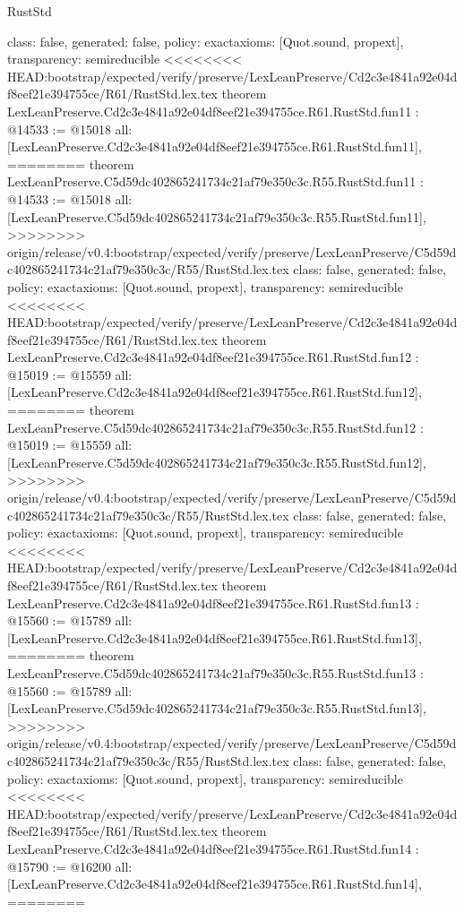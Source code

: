 \begin{lexlean}{RustStd}
\begin{coremodule}
{\begin{coremodule}
{{{{{{{{{{{{{{  class: false,
  generated: false,
  policy: exact{axioms: [Quot.sound, propext]},
  transparency: semireducible
}
<<<<<<<< HEAD:bootstrap/expected/verify/preserve/LexLeanPreserve/Cd2c3e4841a92e04df8eef21e394755ce/R61/RustStd.lex.tex
theorem LexLeanPreserve.Cd2c3e4841a92e04df8eef21e394755ce.R61.RustStd.fun11 : @14533 := @15018 {
  all: [LexLeanPreserve.Cd2c3e4841a92e04df8eef21e394755ce.R61.RustStd.fun11],
========
theorem LexLeanPreserve.C5d59dc402865241734c21af79e350c3c.R55.RustStd.fun11 : @14533 := @15018 {
  all: [LexLeanPreserve.C5d59dc402865241734c21af79e350c3c.R55.RustStd.fun11],
>>>>>>>> origin/release/v0.4:bootstrap/expected/verify/preserve/LexLeanPreserve/C5d59dc402865241734c21af79e350c3c/R55/RustStd.lex.tex
  class: false,
  generated: false,
  policy: exact{axioms: [Quot.sound, propext]},
  transparency: semireducible
}
<<<<<<<< HEAD:bootstrap/expected/verify/preserve/LexLeanPreserve/Cd2c3e4841a92e04df8eef21e394755ce/R61/RustStd.lex.tex
theorem LexLeanPreserve.Cd2c3e4841a92e04df8eef21e394755ce.R61.RustStd.fun12 : @15019 := @15559 {
  all: [LexLeanPreserve.Cd2c3e4841a92e04df8eef21e394755ce.R61.RustStd.fun12],
========
theorem LexLeanPreserve.C5d59dc402865241734c21af79e350c3c.R55.RustStd.fun12 : @15019 := @15559 {
  all: [LexLeanPreserve.C5d59dc402865241734c21af79e350c3c.R55.RustStd.fun12],
>>>>>>>> origin/release/v0.4:bootstrap/expected/verify/preserve/LexLeanPreserve/C5d59dc402865241734c21af79e350c3c/R55/RustStd.lex.tex
  class: false,
  generated: false,
  policy: exact{axioms: [Quot.sound, propext]},
  transparency: semireducible
}
<<<<<<<< HEAD:bootstrap/expected/verify/preserve/LexLeanPreserve/Cd2c3e4841a92e04df8eef21e394755ce/R61/RustStd.lex.tex
theorem LexLeanPreserve.Cd2c3e4841a92e04df8eef21e394755ce.R61.RustStd.fun13 : @15560 := @15789 {
  all: [LexLeanPreserve.Cd2c3e4841a92e04df8eef21e394755ce.R61.RustStd.fun13],
========
theorem LexLeanPreserve.C5d59dc402865241734c21af79e350c3c.R55.RustStd.fun13 : @15560 := @15789 {
  all: [LexLeanPreserve.C5d59dc402865241734c21af79e350c3c.R55.RustStd.fun13],
>>>>>>>> origin/release/v0.4:bootstrap/expected/verify/preserve/LexLeanPreserve/C5d59dc402865241734c21af79e350c3c/R55/RustStd.lex.tex
  class: false,
  generated: false,
  policy: exact{axioms: [Quot.sound, propext]},
  transparency: semireducible
}
<<<<<<<< HEAD:bootstrap/expected/verify/preserve/LexLeanPreserve/Cd2c3e4841a92e04df8eef21e394755ce/R61/RustStd.lex.tex
theorem LexLeanPreserve.Cd2c3e4841a92e04df8eef21e394755ce.R61.RustStd.fun14 : @15790 := @16200 {
  all: [LexLeanPreserve.Cd2c3e4841a92e04df8eef21e394755ce.R61.RustStd.fun14],
========
}}}}}}}}}}}}}}}}}
\end{coremodule}}
\end{coremodule}
\end{lexlean}
